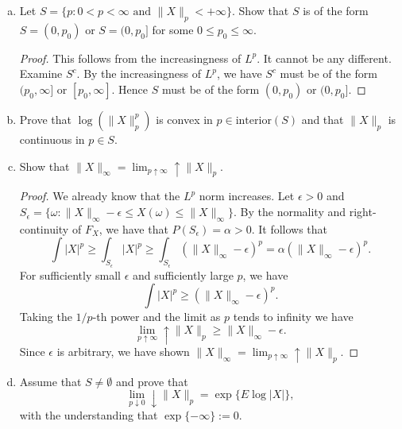 \documentclass[letterpaper,12pt]{article}
\begin{document}
\begin{enumerate}[(a)]
\item
Let $S = \{ p: 0 < p <\infty \text{ and } \|X\|_p < +\infty\}$. 
Show that $S$ is of the form $S = (0,p_0)$ or $S = (0,p_0]$ for some $0 \leq p_0 \leq \infty$.

\begin{proof}
This follows from the increasingness of $L^p$. It cannot be any different. Examine $S^c$. By the increasingness of $L^p$, we have $S^c$ must be of the form $(p_0, \infty]$ or $[p_0, \infty]$. Hence $S$ must be of the form $(0, p_0)$ or $(0,p_0]$.
\end{proof}

\item
Prove that $\log(\|X\|_p^p)$ is convex in $p \in \text{interior}(S)$ and that $\|X\|_p$ is continuous in $p \in S$.

\item
Show that $\|X\|_\infty = \lim_{p \uparrow \infty} \uparrow \|X\|_p$.

\begin{proof}
We already know that the $L^p$ norm increases. Let $\epsilon > 0$ and 
$S_\epsilon = \{ \omega : \|X\|_\infty - \epsilon \leq X(\omega) \leq \|X\|_\infty \}$. By the normality and right-continuity of $F_X$, we have that $P(S_\epsilon) = \alpha > 0$. It follows that 
\[
\int |X|^p \geq \int_{S_\epsilon} |X|^p \geq \int_{S_\epsilon} (\|X\|_\infty - \epsilon)^p = \alpha (\|X\|_\infty - \epsilon)^p.
\]
For sufficiently small $\epsilon$ and sufficiently large $p$, we have 
\[
\int |X|^p \geq (\|X\|_\infty - \epsilon)^p.
\]
Taking the $1/p$-th power and the limit as $p$ tends to infinity we have 
\[
\lim_{p \uparrow \infty} \uparrow \|X\|_p \geq \|X\|_\infty - \epsilon.
\]
Since $\epsilon$ is arbitrary, we have shown $\|X\|_\infty = \lim_{p \uparrow \infty} \uparrow \|X\|_p$.
\end{proof}

\item
Assume that $S \neq \emptyset$ and prove that 
\[
\lim_{p \downarrow 0} \downarrow \|X\|_p = \exp\{E\log|X|\},
\]
with the understanding that $\exp\{-\infty\} := 0$.

\end{enumerate}
\end{document}
